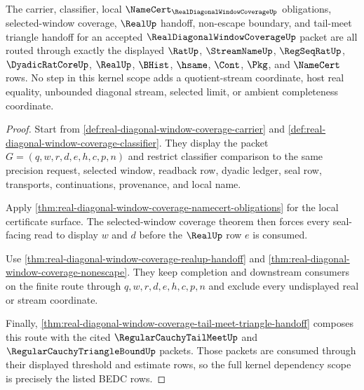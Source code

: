 \begin{theorem}
\label{thm:real-diagonal-window-coverage-kernel-scope}
The carrier, classifier, local $\NameCert_{\RealDiagonalWindowCoverageUp}$ obligations, selected-window coverage, $\RealUp$ handoff, non-escape boundary, and tail-meet triangle handoff for an accepted $\RealDiagonalWindowCoverageUp$ packet are all routed through exactly the displayed $\RatUp$, $\StreamNameUp$, $\RegSeqRatUp$, $\DyadicRatCoreUp$, $\RealUp$, $\BHist$, $\hsame$, $\Cont$, $\Pkg$, and $\NameCert$ rows. No step in this kernel scope adds a quotient-stream coordinate, host real equality, unbounded diagonal stream, selected limit, or ambient completeness coordinate.
\end{theorem}
\begin{proof}
Start from \autoref{def:real-diagonal-window-coverage-carrier} and \autoref{def:real-diagonal-window-coverage-classifier}. They display the packet $G=(q,w,r,d,e,h,c,p,n)$ and restrict classifier comparison to the same precision request, selected window, readback row, dyadic ledger, seal row, transports, continuations, provenance, and local name.

Apply \autoref{thm:real-diagonal-window-coverage-namecert-obligations} for the local certificate surface. The selected-window coverage theorem then forces every seal-facing read to display $w$ and $d$ before the $\RealUp$ row $e$ is consumed.

Use \autoref{thm:real-diagonal-window-coverage-realup-handoff} and \autoref{thm:real-diagonal-window-coverage-nonescape}. They keep completion and downstream consumers on the finite route through $q,w,r,d,e,h,c,p,n$ and exclude every undisplayed real or stream coordinate.

Finally, \autoref{thm:real-diagonal-window-coverage-tail-meet-triangle-handoff} composes this route with the cited $\RegularCauchyTailMeetUp$ and $\RegularCauchyTriangleBoundUp$ packets. Those packets are consumed through their displayed threshold and estimate rows, so the full kernel dependency scope is precisely the listed BEDC rows.
\end{proof}

